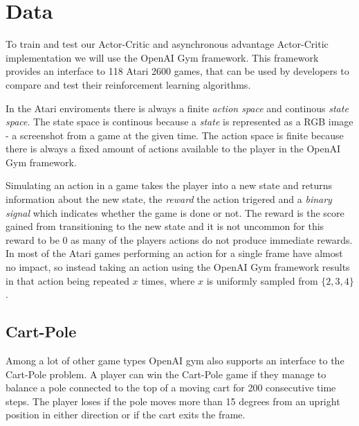 \documentclass[11pt]{article}
\begin{document}
\maketitle

\section{Data}\label{Data}

To train and test our Actor-Critic and asynchronous advantage Actor-Critic implementation we will use
the OpenAI Gym framework\cite{openAIGym}.
This framework provides an interface to 118 Atari 2600 games,
that can be used by developers to compare and test their reinforcement learning algorithms.

 
In the Atari enviroments there is always a finite \textit{action space} and continous \textit{state space}.
The state space is continous because a \textit{state} is represented as a RGB image - a screenshot from a game
at the given time. The action space is finite because there is always a fixed amount of
actions available to the player in the OpenAI Gym framework.

Simulating an action in a game takes the player into a new state
and returns information about the new state,
the \textit{reward} the action trigered and a \textit{binary signal} which indicates whether the 
game is done or not.
The reward is the score gained from transitioning to the new state and
it is not uncommon for this reward to be $0$ as many of the players actions do not produce immediate rewards.
In most of the Atari games performing an action for a single frame have almost no impact,
so instead taking an action using the OpenAI Gym framework
results in that action being repeated $x$ times, where $x$ is uniformly sampled from $\{2, 3, 4\}$.

\subsection{Cart-Pole}

Among a lot of other game types OpenAI gym also supports an interface
to the Cart-Pole problem.
A player can win the Cart-Pole game if they manage to balance a pole connected to the top of a moving cart for
200 consecutive time steps.
The player loses if the pole moves more than 15 degrees from an upright position in
either direction or if the cart exits the frame.
\end{document}
